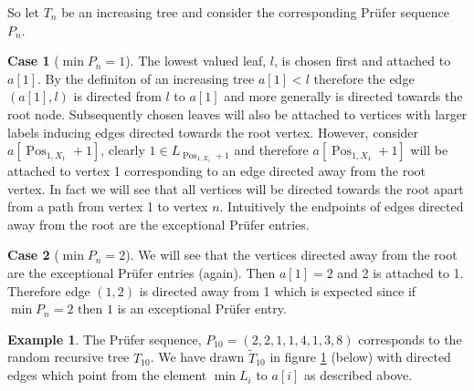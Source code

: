 \documentclass[10pt]{article} %
\theoremstyle{definition}
\newtheorem{ex}[thm]{Example}
\newtheorem{case}{Case}
\DeclareMathOperator{\Pos}{Pos}
\begin{document}
So let $T_{n}$ be an increasing tree and consider the corresponding Pr\"{u}fer sequence $P_{n}$.  

\begin{case}[$\min P_{n} = 1$] 
The lowest valued leaf, $l$, is chosen first and attached to $a[1]$. By the definiton of an increasing tree $a[1] < l$ therefore the edge $(a[1],l)$ is directed from $l$ to $a[1]$ and more generally is directed towards the root node. Subsequently chosen leaves will also be attached to vertices with larger labels inducing edges directed towards the root vertex.  However, consider $a[\Pos_{1,X_{1}} + 1]$, clearly $1 \in L_{\Pos_{1,X_{1}} + 1}$ and therefore $a[\Pos_{1,X_{1}} + 1]$ will be attached to vertex 1 corresponding to an edge directed away from the root vertex.  In fact we will see that all vertices will be directed towards the root apart from a path from vertex 1 to vertex $n$. Intuitively the endpoints of edges directed away from the root are the exceptional Pr\"{u}fer entries.  
\end{case}

\begin{case}[$\min P_{n} = 2$] 
 We will see that the vertices directed away from the root are the exceptional Pr\"{u}fer entries (again). Then $a[1] = 2$ and 2 is attached to 1.  Therefore edge $(1,2)$ is directed away from 1 which is expected since if $\min P_{n} = 2$ then $1$ is an exceptional Pr\"{u}fer entry.    
\end{case}

\begin{ex}
 The Pr\"{u}fer sequence, $P_{10} = (2,2,1,1,4,1,3,8)$ corresponds to the random recursive tree $T_{10}$.  We have drawn $\tilde{T}_{10}$ in figure \ref{fig:2} (below) with directed edges which point from the element $\min L_{i}$ to $a[i]$ as described above.  
 
 \begin{figure}

\begin{centering} 
\caption{}\label{fig:2}
\end{centering}
\end{figure}
\end{ex}
\end{document}

